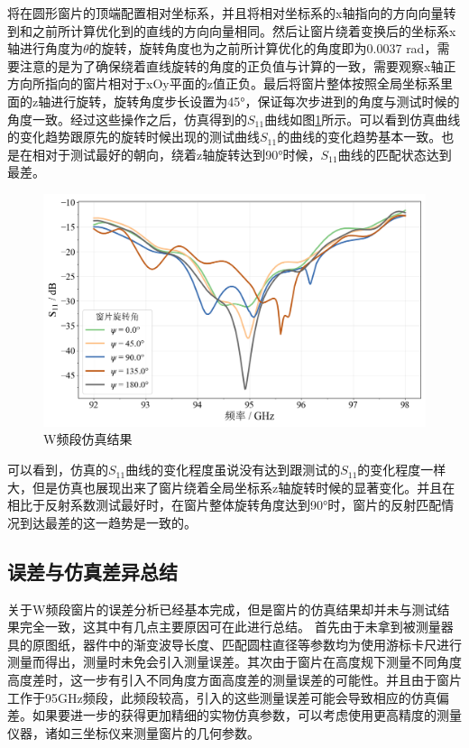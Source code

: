 \documentclass[master]{thesis-uestc}
\begin{document}
将在圆形窗片的顶端配置相对坐标系，并且将相对坐标系的x轴指向的方向向量转到和之前所计算优化到的直线的方向向量相同。然后让窗片绕着变换后的坐标系x轴进行角度为\(\theta \)的旋转，旋转角度也为之前所计算优化的角度即为0.0037 rad，需要注意的是为了确保绕着直线旋转的角度的正负值与计算的一致，需要观察x轴正方向所指向的窗片相对于xOy平面的z值正负。最后将窗片整体按照全局坐标系里面的z轴进行旋转，旋转角度步长设置为45°，保证每次步进到的角度与测试时候的角度一致。经过这些操作之后，仿真得到的\(S_{11}\)曲线如图\ref{fig:W频段仿真结果}所示。可以看到仿真曲线的变化趋势跟原先的旋转时候出现的测试曲线\(S_{11}\)的曲线的变化趋势基本一致。也是在相对于测试最好的朝向，绕着z轴旋转达到90°时候，\(S_{11}\)曲线的匹配状态达到最差。
\begin{figure}[!htb]
    \centering
    \includegraphics[width=0.8\linewidth]{pic/chapter5/W频段仿真结果.png}
    \caption{W频段仿真结果}
    \label{fig:W频段仿真结果}
\end{figure}

可以看到，仿真的\(S_{11}\)曲线的变化程度虽说没有达到跟测试的\(S_{11}\)的变化程度一样大，但是仿真也展现出来了窗片绕着全局坐标系z轴旋转时候的显著变化。并且在相比于反射系数测试最好时，在窗片整体旋转角度达到90°时，窗片的反射匹配情况到达最差的这一趋势是一致的。

\subsection{误差与仿真差异总结}
关于W频段窗片的误差分析已经基本完成，但是窗片的仿真结果却并未与测试结果完全一致，这其中有几点主要原因可在此进行总结。
首先由于未拿到被测量器具的原图纸，器件中的渐变波导长度、匹配圆柱直径等参数均为使用游标卡尺进行测量而得出，测量时未免会引入测量误差。其次由于窗片在高度规下测量不同角度高度差时，这一步有引入不同角度方面高度差的测量误差的可能性。并且由于窗片工作于95GHz频段，此频段较高，引入的这些测量误差可能会导致相应的仿真偏差。如果要进一步的获得更加精细的实物仿真参数，可以考虑使用更高精度的测量仪器，诸如三坐标仪来测量窗片的几何参数。
\end{document}
